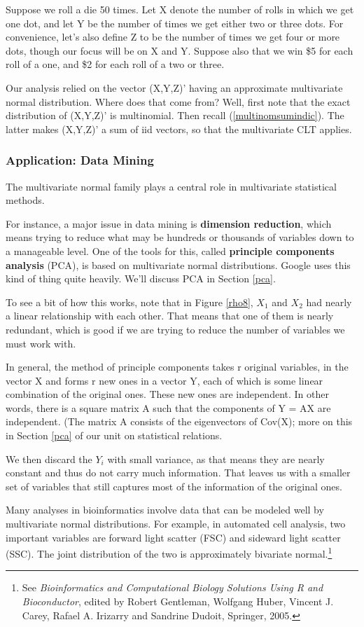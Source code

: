 Suppose we roll a die 50 times.  Let X denote the number of rolls in
which we get one dot, and let Y be the number of times we get either two
or three dots.  For convenience, let's also define Z to be the number of
times we get four or more dots, though our focus will be on X and Y.
Suppose also that we win \$5 for each roll of a one, and \$2 for each
roll of a two or three.

Our analysis relied on the vector (X,Y,Z)' having an approximate
multivariate normal distribution.  Where does that come from?  Well,
first note that the exact distribution of (X,Y,Z)' is multinomial.  Then
recall (\ref{multinomsumindic}).  The latter makes (X,Y,Z)' a sum of
iid vectors, so that the multivariate CLT applies.

\subsubsection{Application:  Data Mining}
\label{datamining}

The multivariate normal family plays a central role in multivariate
statistical methods.  

For instance, a major issue in data mining is {\bf dimension reduction},
which means trying to reduce what may be hundreds or thousands of
variables down to a manageable level.  One of the tools for this, called
{\bf principle components analysis} (PCA), is based on multivariate
normal distributions.  Google uses this kind of thing quite heavily.
We'll discuss PCA in Section \ref{pca}.

To see a bit of how this works, note that in Figure \ref{rho8}, $X_1$
and $X_2$ had nearly a linear relationship with each other.  That means
that one of them is nearly redundant, which is good if we are trying to
reduce the number of variables we must work with.

In general, the method of principle components takes r original
variables, in the vector X and forms r new ones in a vector Y, each of
which is some linear combination of the original ones.  These new ones
are independent.  In other words, there is a square matrix A such that
the components of Y = AX are independent.  (The matrix A consists of the
eigenvectors of Cov(X); more on this in Section \ref{pca} of our unit on
statistical relations.

We then discard the $Y_i$ with small variance, as that means they are
nearly constant and thus do not carry much information.  That leaves us
with a smaller set of variables that still captures most of the
information of the original ones.

Many analyses in bioinformatics involve data that can be modeled well by
multivariate normal distributions.  For example, in automated cell
analysis, two important variables are forward light scatter (FSC) and
sideward light scatter (SSC).  The joint distribution of the two is
approximately bivariate normal.\footnote{See {\it Bioinformatics and
Computational Biology Solutions Using R and Bioconductor}, edited by
Robert Gentleman, Wolfgang Huber, Vincent J. Carey, Rafael A. Irizarry
and Sandrine Dudoit, Springer, 2005.}

